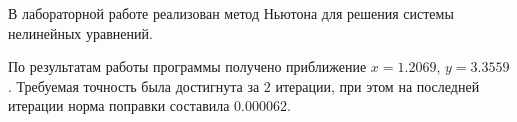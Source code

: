 В лабораторной работе реализован метод Ньютона для решения системы нелинейных уравнений.

По результатам работы программы получено приближение $x = 1.2069$, $y = 3.3559$. Требуемая точность была достигнута за $2$ итерации, при этом на последней итерации норма поправки составила $0.000062$.
